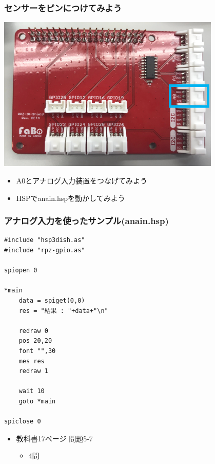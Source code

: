 \begin{frame}
    \frametitle{センサーをピンにつけてみよう}
    \begin{center}
        \includegraphics[width=0.8\textwidth]{images/chap05/text05-img030.png}
        \begin{itemize}
            \item A0とアナログ入力装置をつなげてみよう
            \item HSPでanain.hspを動かしてみよう
        \end{itemize}
    \end{center}
\end{frame}

\begin{frame}[fragile]
    \frametitle{アナログ入力を使ったサンプル(anain.hsp)}
\begin{lstlisting}
#include "hsp3dish.as"
#include "rpz-gpio.as"

spiopen 0

*main
	data = spiget(0,0)
	res = "結果 : "+data+"\n"

	redraw 0
	pos 20,20
	font "",30
	mes res
	redraw 1

	wait 10
	goto *main

spiclose 0
\end{lstlisting}
\end{frame}

\begin{frame}[fragile]
    \begin{itemize}
        \item 教科書17ページ 問題5-7
        \begin{itemize}
            \item 4問
        \end{itemize}
    \end{itemize}
\end{frame}
